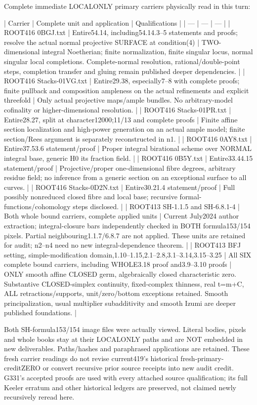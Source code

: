 \documentclass[11pt]{article}
\begin{document}
Complete immediate LOCALONLY primary carriers physically read in this turn:

| Carrier | Complete unit and application | Qualifications |
| --- | --- | --- |
| ROOT416 0BGJ.txt | Entire54.14, including54.14.3--5 statements and proofs; resolve the actual normal projective SURFACE at condition(4) | TWO-dimensional integral Noetherian; finite normalization, finite singular locus, normal singular local completions. Complete-normal resolution, rational/double-point steps, completion transfer and gluing remain published deeper dependencies. |
| ROOT416 Stacks-01VG.txt | Entire29.38, especially7--8 with complete proofs; finite pullback and composition ampleness on the actual refinements and explicit threefold | Only actual projective maps/ample bundles. No arbitrary-model cofinality or higher-dimensional resolution. |
| ROOT416 Stacks-01PR.txt | Entire28.27, split at character12000;11/13 and complete proofs | Finite affine section localization and high-power generation on an actual ample model; finite section/Rees argument is separately reconstructed in n1. |
| ROOT416 0AY8.txt | Entire37.53.6 statement/proof | Proper integral birational scheme over NORMAL integral base, generic H0 its fraction field. |
| ROOT416 0B5Y.txt | Entire33.44.15 statement/proof | Projective/proper one-dimensional fibre degrees, arbitrary residue field; no inference from a generic section on an exceptional surface to all curves. |
| ROOT416 Stacks-0D2N.txt | Entire30.21.4 statement/proof | Full possibly nonreduced closed fibre and local base; recursive formal-functions/cohomology steps disclosed. |
| ROOT413 SH-1.1.5 and SH-6.8.1-4 | Both whole bound carriers, complete applied units | Current July2024 author extraction; integral-closure bars independently checked in BOTH formula153/154 pixels. Partial neighbouring1.1.7/6.8.7 are not applied. These units are retained for audit; n2--n4 need no new integral-dependence theorem. |
| ROOT413 BFJ setting, simple-modification domain,1.10--1.15,2.1--2.8,3.1--3.14,3.15--3.25 | All SIX complete bound carriers, including WHOLE3.18 proof and3.9--3.10 proofs | ONLY smooth affine CLOSED germ, algebraically closed characteristic zero. Substantive CLOSED-simplex continuity, fixed-complex thinness, real t=m+C, ALL retractions/supports, unit/zero/bottom exceptions retained. Smooth principalization, usual multiplier subadditivity and smooth Izumi are deeper published foundations. |

Both SH-formula153/154 image files were actually viewed. Literal bodies, pixels and whole books stay at their LOCALONLY paths and are NOT embedded in new deliverables. Paths/hashes and paraphrased applications are retained. These fresh carrier readings do not revise current419's historical fresh-primary-creditZERO or convert recursive prior source receipts into new audit credit. G331's accepted proofs are used with every attached source qualification; its full Keeler erratum and other historical ledgers are preserved, not claimed newly recursively reread here.
\end{document}
